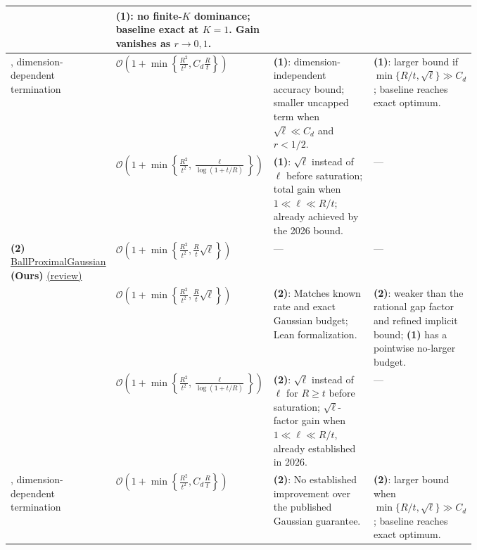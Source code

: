 \begin{table}[tp]
\begin{threeparttable}
\begin{tabularx}{\linewidth}{@{}>{\raggedright\arraybackslash}p{0.20\linewidth}>{\raggedright\arraybackslash}p{0.32\linewidth}>{\raggedright\arraybackslash}p{0.25\linewidth}>{\raggedright\arraybackslash}X@{}}
& \textbf{(1)}: no finite-$K$ dominance; baseline exact at $K=1$. Gain vanishes as $r\to0,1$. \\
\midrule
\citep[Thm.~4.5]{cbpRichtarikLi2026v1}, dimension-dependent termination
& $\mathcal{O}\!\left(1+\min\left\{\frac{R^2}{t^2},C_d\frac Rt\right\}\right)$
& \textbf{(1)}: dimension-independent accuracy bound; smaller uncapped term when $\sqrt \ell\ll C_d$ and $r<1/2$.
& \textbf{(1)}: larger bound if $\min\{R/t,\sqrt \ell\}\gg C_d$; baseline reaches exact optimum. \\
\midrule
\citep[Thm.~8.1(iii), Cor.~8.2]{cbpGruntkowskaEtAl2025v2}
& $\mathcal{O}\!\left(1+\min\left\{\frac{R^2}{t^2},\frac{\ell}{\log(1+t/R)}\right\}\right)$
& \textbf{(1)}: $\sqrt \ell$ instead of $\ell$ before saturation; total gain when $1\ll \ell\ll R/t$; already achieved by the 2026 bound.
& --- \\
\midrule
\textbf{(2)} \href{https://github.com/k3nfalt/longtails/blob/main/LongTails/Theorems/BallProximalGaussian.lean}{Ball\allowbreak{}Proximal\allowbreak{}Gaussian} \textbf{(Ours)} \href{https://github.com/k3nfalt/longtails/blob/main/scripts/reviews/BallProximalGaussian.md}{(review)}
& $\mathcal{O}\!\left(1+\min\left\{\frac{R^2}{t^2},\frac Rt\sqrt \ell\right\}\right)$
& ---
& --- \\
\midrule
\citep[Thm.~3.4, Eqs.~(42)--(43)]{cbpRichtarikLi2026v1}
& $\mathcal{O}\!\left(1+\min\left\{\frac{R^2}{t^2},\frac Rt\sqrt \ell\right\}\right)$
& \textbf{(2)}: Matches known rate and exact Gaussian budget; Lean formalization.
& \textbf{(2)}: weaker than the rational gap factor and refined implicit bound; \textbf{(1)} has a pointwise no-larger budget. \\
\midrule
\citep[Thm.~8.1(iii), Cor.~8.2]{cbpGruntkowskaEtAl2025v2}
& $\mathcal{O}\!\left(1+\min\left\{\frac{R^2}{t^2},\frac{\ell}{\log(1+t/R)}\right\}\right)$
& \textbf{(2)}: $\sqrt \ell$ instead of $\ell$ for $R\ge t$ before saturation; $\sqrt \ell$-factor gain when $1\ll\ell\ll R/t$, already established in 2026.
& --- \\
\midrule
\citep[Thm.~4.5]{cbpRichtarikLi2026v1}, dimension-dependent termination
& $\mathcal{O}\!\left(1+\min\left\{\frac{R^2}{t^2},C_d\frac Rt\right\}\right)$
& \textbf{(2)}: No established improvement over the published Gaussian guarantee.
& \textbf{(2)}: larger bound when $\min\{R/t,\sqrt \ell\}\gg C_d$; baseline reaches exact optimum. \\
\bottomrule
\end{tabularx}
\begin{tablenotes}[flushleft]\footnotesize

\end{tablenotes}
\end{threeparttable}
\end{table}
